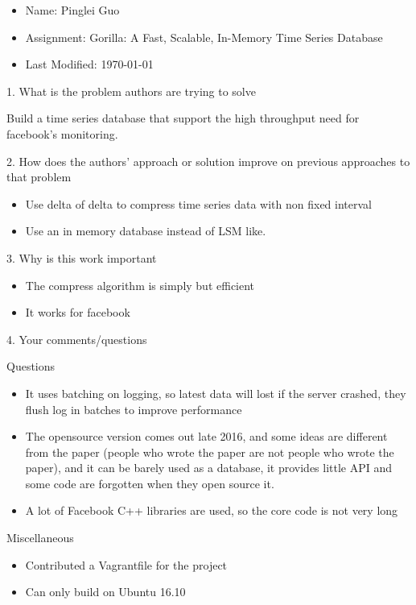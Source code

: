 \documentclass[12pt,a4paper,oneside]{article}
\begin{document}
\begin{itemize}
  \item Name: Pinglei Guo
  \item Assignment: Gorilla: A Fast, Scalable, In-Memory Time Series Database
  \item Last Modified: \today
\end{itemize}

1. What is the problem authors are trying to solve

\medskip

Build a time series database that support the high throughput need for facebook's
monitoring.

\bigskip

2. How does the authors’ approach or solution improve on previous approaches to that problem

\medskip

\begin{itemize}
  \item Use delta of delta to compress time series data with non fixed interval
  \item Use an in memory database instead of LSM like.
\end{itemize}

\bigskip

3. Why is this work important

\medskip

\begin{itemize}
  \item The compress algorithm is simply but efficient
  \item It works for facebook
\end{itemize}

\bigskip

4. Your comments/questions

\medskip

Questions

\begin{itemize}
  \item It uses batching on logging, so latest data will lost if the server crashed, they flush log in batches to improve
  performance
  \item The opensource version comes out late 2016, and some ideas are different from
  the paper (people who wrote the paper are not people who wrote the paper),
  and it can be barely used as a database, it provides little API and some code are forgotten when they open source it.
  \item A lot of Facebook C++ libraries are used, so the core code is not very long
\end{itemize}

Miscellaneous

\begin{itemize}
  \item Contributed a Vagrantfile for the project
  \item Can only build on Ubuntu 16.10
\end{itemize}
\end{document}
